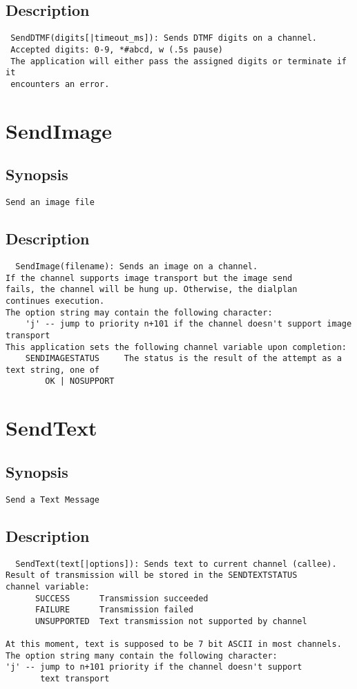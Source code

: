 \subsection{Description}
\begin{verbatim}
 SendDTMF(digits[|timeout_ms]): Sends DTMF digits on a channel. 
 Accepted digits: 0-9, *#abcd, w (.5s pause)
 The application will either pass the assigned digits or terminate if it
 encounters an error.

\end{verbatim}


\section{SendImage}
\subsection{Synopsis}
\begin{verbatim}
Send an image file
\end{verbatim}
\subsection{Description}
\begin{verbatim}
  SendImage(filename): Sends an image on a channel. 
If the channel supports image transport but the image send
fails, the channel will be hung up. Otherwise, the dialplan
continues execution.
The option string may contain the following character:
	'j' -- jump to priority n+101 if the channel doesn't support image transport
This application sets the following channel variable upon completion:
	SENDIMAGESTATUS		The status is the result of the attempt as a text string, one of
		OK | NOSUPPORT 

\end{verbatim}


\section{SendText}
\subsection{Synopsis}
\begin{verbatim}
Send a Text Message
\end{verbatim}
\subsection{Description}
\begin{verbatim}
  SendText(text[|options]): Sends text to current channel (callee).
Result of transmission will be stored in the SENDTEXTSTATUS
channel variable:
      SUCCESS      Transmission succeeded
      FAILURE      Transmission failed
      UNSUPPORTED  Text transmission not supported by channel

At this moment, text is supposed to be 7 bit ASCII in most channels.
The option string many contain the following character:
'j' -- jump to n+101 priority if the channel doesn't support
       text transport

\end{verbatim}


